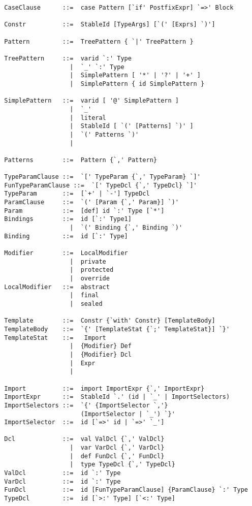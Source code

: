 \documentclass[a4paper,12pt,twoside,titlepage]{book}
\begin{document}
\begin{lstlisting}
  CaseClause      ::=  case Pattern [`if' PostfixExpr] `=>' Block 

  Constr          ::=  StableId [TypeArgs] [`(' [Exprs] `)']  

  Pattern         ::=  TreePattern { `|' TreePattern }

  TreePattern     ::=  varid `:' Type
                    |  `_' `:' Type
                    |  SimplePattern [ '*' | '?' | '+' ]
                    |  SimplePattern { id SimplePattern }

  SimplePattern   ::=  varid [ '@' SimplePattern ]
                    |  `_'
                    |  literal
                    |  StableId [ `(' [Patterns] `)' ]
                    |  `(' Patterns `)'
                    |   

  Patterns        ::=  Pattern {`,' Pattern}

  TypeParamClause ::=  `[' TypeParam {`,' TypeParam} `]'
  FunTypeParamClause ::=  `[' TypeDcl {`,' TypeDcl} `]'
  TypeParam       ::=  [`+' | `-'] TypeDcl
  ParamClause     ::=  `(' [Param {`,' Param}] `)'
  Param           ::=  [def] id `:' Type [`*']
  Bindings        ::=  id [`:' Type1]
                    |  `(' Binding {`,' Binding `)'
  Binding         ::=  id [`:' Type]

  Modifier        ::=  LocalModifier
                    |  private
                    |  protected
                    |  override 
  LocalModifier   ::=  abstract
                    |  final
                    |  sealed

  Template        ::=  Constr {`with' Constr} [TemplateBody]
  TemplateBody    ::=  `{' [TemplateStat {`;' TemplateStat}] `}'
  TemplateStat    ::=   Import
                    |  {Modifier} Def
                    |  {Modifier} Dcl
                    |  Expr
                    |

  Import          ::=  import ImportExpr {`,' ImportExpr}
  ImportExpr      ::=  StableId `.' (id | `_' | ImportSelectors)
  ImportSelectors ::=  `{' {ImportSelector `,'} 
                       (ImportSelector | `_') `}'
  ImportSelector  ::=  id [`=>' id | `=>' `_']

  Dcl             ::=  val ValDcl {`,' ValDcl}
                    |  var VarDcl {`,' VarDcl}
                    |  def FunDcl {`,' FunDcl}
                    |  type TypeDcl {`,' TypeDcl}
  ValDcl          ::=  id `:' Type
  VarDcl          ::=  id `:' Type
  FunDcl          ::=  id [FunTypeParamClause] {ParamClause} `:' Type
  TypeDcl         ::=  id [`>:' Type] [`<:' Type]


\end{lstlisting}
\end{document}
